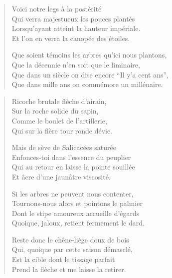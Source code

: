 
\begin{verse}
Voici notre legs à la postérité\\
Qui verra majestueux les pouces plantés\\
Lorsqu’ayant atteint la hauteur impériale.\\
Et l’on en verra la canopée des étoiles.

Que soient  témoins les arbres qu’ici nous plantons,\\
Que la décennie n’en soit que le liminaire,\\
Que dans un siècle on dise encore \enquote{Il y’a cent ans},\\
Que dans mille ans on commémore un millénaire.
\end{verse}

\begin{verse}
Ricoche brutale flèche d’airain,\\
Sur la roche solide du sapin,\\
Comme le boulet de l’artillerie,\\
Qui sur la fière tour  ronde dévie.\label{foot.tourRonde}

Mais de sève de Salicacées saturée\\
Enfonces-toi dans l’essence du peuplier\\
Qui au retour en laisse la pointe souillée\\
Et âcre d’une jaunâtre viscosité.

Si les arbres ne peuvent nous contenter,\\
Tournons-nous alors et pointons le palmier\\
Dont le stipe amoureux accueille d’égards\\
Quoique, jaloux, retient fermement le dard.

Reste donc le chêne-liège doux de bois\\
Qui, quoique par cette saison démasclé,\\
Est la  cible dont le tissage parfait\\
Prend la flèche et me laisse la retirer.
\end{verse}


